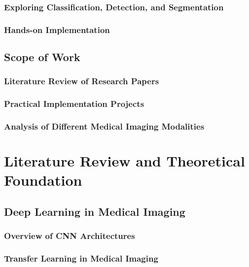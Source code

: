 \documentclass[12pt,a4paper]{report}
\begin{document}
\subsection{Exploring Classification, Detection, and Segmentation}

\subsection{Hands-on Implementation}

\section{Scope of Work}

\subsection{Literature Review of Research Papers}

\subsection{Practical Implementation Projects}

\subsection{Analysis of Different Medical Imaging Modalities}

\chapter{Literature Review and Theoretical Foundation}

\section{Deep Learning in Medical Imaging}

\subsection{Overview of CNN Architectures}

\subsection{Transfer Learning in Medical Imaging}
\end{document}
